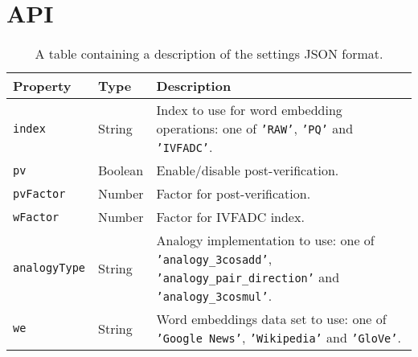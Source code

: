 \section{API}
\label{sec:api-description}
\begin{table}[bph]
	\centering
	\begin{tabulary}{\linewidth}{|l|l|L|}
		\hline
		\textbf{Property} & \textbf{Type} & \textbf{Description} \\
		\hline
		\texttt{index} & String & Index to use for word embedding operations: one of \texttt{'RAW'}, \texttt{'PQ'} and \texttt{'IVFADC'}. \\
		\hline
		\texttt{pv} & Boolean & Enable/disable post-verification. \\
		\hline
		\texttt{pvFactor} & Number & Factor for post-verification. \\
		\hline
		\texttt{wFactor} & Number & Factor for IVFADC index. \\
		\hline
		\texttt{analogyType} & String & Analogy implementation to use: one of \texttt{'analogy\_3cosadd'}, \texttt{'analogy\_pair\_direction'} and \texttt{'analogy\_3cosmul'}. \\
		\hline
		\texttt{we} & String & Word embeddings data set to use: one of \texttt{'Google News'}, \texttt{'Wikipedia'} and \texttt{'GloVe'}. \\
		\hline
	\end{tabulary}
	\caption{A table containing a description of the settings JSON format.}
	\label{tab:settings-format}
\end{table}

